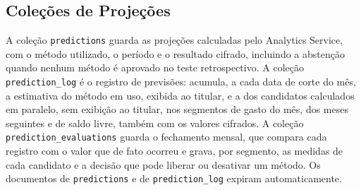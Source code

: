 \subsection{Coleções de Projeções}

A coleção \texttt{predictions} guarda as projeções calculadas pelo Analytics Service, com o método utilizado, o período e o resultado cifrado, incluindo a abstenção quando nenhum método é aprovado no teste retrospectivo. A coleção \texttt{prediction\_log} é o registro de previsões: acumula, a cada data de corte do mês, a estimativa do método em uso, exibida ao titular, e a dos candidatos calculados em paralelo, sem exibição ao titular, nos segmentos de gasto do mês, dos meses seguintes e de saldo livre, também com os valores cifrados. A coleção \texttt{prediction\_evaluations} guarda o fechamento mensal, que compara cada registro com o valor que de fato ocorreu e grava, por segmento, as medidas de cada candidato e a decisão que pode liberar ou desativar um método. Os documentos de \texttt{predictions} e de \texttt{prediction\_log} expiram automaticamente.
